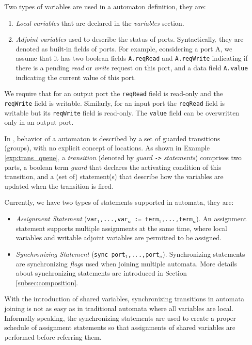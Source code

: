  Two types of variables are used in a automaton definition, they are:
\begin{enumerate}
    \item \emph{Local variables} that are declared in the \emph{variables} section. 
    \item \emph{Adjoint variables} used to describe the status of ports. Syntactically, they are denoted as built-in fields of ports. For example, considering a port A, we assume that it has two boolean fields \texttt{A.reqRead} and \texttt{A.reqWrite} indicating if there is a pending \emph{read} or \emph{write} request on this port, and a data field \texttt{A.value} indicating the current value of this port.
\end{enumerate}

We require that for an output port the \texttt{reqRead} field is read-only and the \texttt{reqWrite} field is writable. Similarly, for an input port the \texttt{reqRead} field is writable but its \texttt{reqWrite} field is read-only. The \texttt{value} field can be overwritten only in an output port.

In \lang{}, behavior of a automaton is described by a set of guarded transitions (groups), with no explicit concept of locations. As shown in  Example \ref{exp:trans_queue}, a \emph{transition} (denoted by \emph{guard} \texttt{->} \emph{statements}) comprises two parts, a boolean term \emph{guard} that declares the activating condition of this transition, and a (set of) statement(s) that describe how the variables are updated when the transition is fired.

Currently, we have two types of statements supported in automata, they are:
\begin{itemize}
    \item \emph{Assignment Statement} (\texttt{var$_1$,...,var$_n$ := term$_1$,...,term$_n$}). An assignment statement supports multiple assignments at the same time, where local variables and writable adjoint variables are permitted to be assigned.
    \item \emph{Synchronizing Statement} (\texttt{sync port$_1$,...,port$_n$}). Synchronizing statements are synchronizing \emph{flag}s used when joining multiple automata. More details about synchronizing statements are introduced in Section \ref{subsec:composition}.
\end{itemize}

With the introduction of shared variables, synchronizing transitions in automata joining is not as easy as in traditional automata where all variables are local. Informally speaking, the synchronizing statements are used to create a proper schedule of assignment statements so that assignments of shared variables are performed before referring them.


